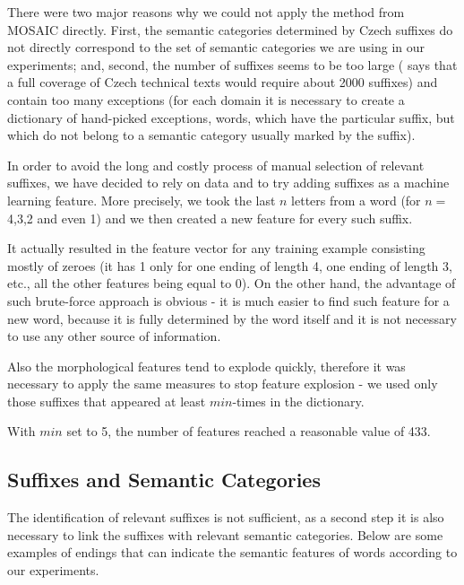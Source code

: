 \documentclass[letterpaper]{article}
\begin{document}
There were two major reasons why we could not apply the method from MOSAIC directly. First, the semantic categories determined by Czech suffixes do not directly correspond to the set of semantic categories we are using in our experiments; and, second, the number of suffixes seems to be too large (\cite{kirschner1983} says that a full coverage of Czech technical texts would require about 2000 suffixes) and contain too many exceptions (for each domain it is necessary to create a dictionary of hand-picked exceptions, words, which have the particular suffix, but which do not belong to a semantic category usually marked by the suffix).     
  
In order to avoid the long and costly process of manual selection of relevant suffixes, we have decided to rely on data and  
to try adding suffixes as a machine learning feature.  
More precisely, we took the last $n$ letters from 
a word (for $n=$ 4,3,2 and even 1) and we then created a new feature for every such suffix. 

It actually resulted in the feature vector for any training example consisting mostly of zeroes 
(it has 1 only for one ending of length 4, one ending of length 3, etc., all the other features being equal to 0). 
On the other hand, the advantage of such brute-force approach is obvious - 
it is much easier to find such feature 
for a new word, because it is fully determined by the word itself and it is not necessary to use any other source of information.

Also the morphological features tend to explode quickly, therefore it was necessary to apply the same measures to stop feature explosion - we used only those suffixes that appeared at least $min$-times in the dictionary.

With $min$ set to 5, the number of features reached a reasonable value of 433.

\subsection{Suffixes and Semantic Categories}
The identification of relevant suffixes is not sufficient,
as a second step it is also necessary to link the suffixes with relevant semantic categories. 
Below are some examples of endings that
can indicate the semantic features of words according to our experiments.
\end{document}
